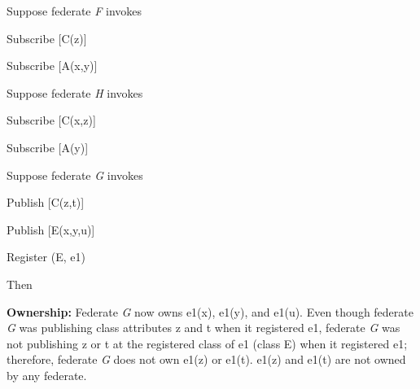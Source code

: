 \begin{annexstdpage}
    Suppose federate \textit{F} invokes

    \begin{stddashlist}
        \item Subscribe [C(z)]
        \item Subscribe [A(x,y)]
    \end{stddashlist}

    Suppose federate \textit{H} invokes

    \begin{stddashlist}
        \item Subscribe [C(x,z)]
        \item Subscribe [A(y)]
    \end{stddashlist}

    Suppose federate \textit{G} invokes

    \begin{stddashlist}
        \item Publish [C(z,t)]
        \item Publish [E(x,y,u)]
        \item Register (E, e1)
    \end{stddashlist}

    Then

    \begin{stddashlist}
        \item \textbf{Ownership:} Federate \textit{G} now owns e1(x), e1(y), and e1(u). Even though federate \textit{G} was publishing class attributes z and t when it registered e1, federate \textit{G} was not publishing z or t at the registered class of e1 (class E) when it registered e1; therefore, federate \textit{G} does not own e1(z) or e1(t). e1(z) and e1(t) are not owned by any federate.
    \end{stddashlist}
\end{annexstdpage}

\clearpage

